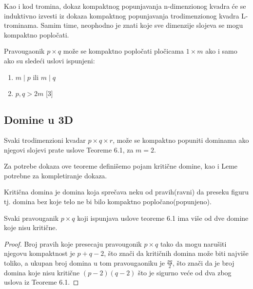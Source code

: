 Kao i kod tromina, dokaz kompaktnog popunjavanja n-dimenzionog kvadra će se induktivno izvesti iz dokaza kompaktnog popunjavanja trodimenzionog kvadra L-trominama. Samim time, neophodno je znati koje sve dimenzije slojeva se mogu kompaktno popločati. 

\begin{Theorem}
    Pravougaonik $p\times q$ može se kompaktno popločati pločicama $1\times m$ ako i samo ako su sledeći uslovi ispunjeni:
    \begin{enumerate}
        \item $m\mid p$ ili $m\mid q$
        \item $p,q>2m$ [3]
   \end{enumerate}
\end{Theorem}

\subsection{Domine u 3D}
    


\begin{Theorem}
    Svaki trodimenzioni kvadar $p\times q\times r$, može se kompaktno popuniti dominama ako njegovi slojevi prate uslove Teoreme 6.1, za $m=2$.
\end{Theorem}


Za potrebe dokaza ove teoreme definišemo pojam kritične domine, kao i Leme potrebne za kompletiranje dokaza.

\begin{Definition}
    Kritična domina je domina koja sprečava neku od pravih(ravni) da preseku figuru tj. domina bez koje telo ne bi bilo kompaktno popločano(popunjeno).
\end{Definition}

\begin{Lemma}
    Svaki pravouganik $p\times q$ koji ispunjava uslove teoreme 6.1 ima više od dve domine koje nisu kritične.
\end{Lemma}

\begin{proof}
    Broj pravih koje presecaju pravougonik $p\times q$ tako da mogu narušiti njegovu kompaktnost je $p+q-2$, što znači da kritičnih domina može biti najviše toliko, a ukupan broj domina u tom pravougaoniku je $\frac{pq}{2}$, što znači da je broj domina koje nisu kritične $(p-2)(q-2)$ što je sigurno veće od dva zbog uslova iz Teoreme 6.1.
\end{proof}



